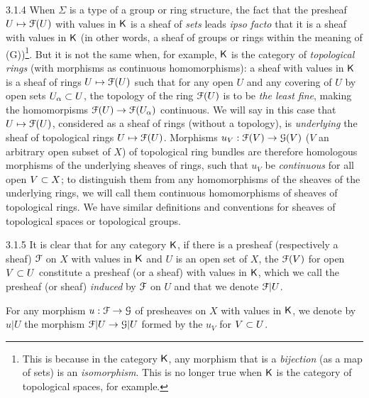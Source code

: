 \documentclass[../main.tex]{subfiles}
\begin{document}
\begin{cx}{3.1.4}
When $\Sigma$ is a type of a group or ring structure, the fact that
the presheaf $U\mapsto\mathcal{F}(U)$ with values in $\mathsf{K}$ is a sheaf of \emph{sets} leads \emph{ipso facto}
that it is a sheaf with values in $\mathsf{K}$ (in other words, a sheaf of groups or rings
within the meaning of (G))\footnote{This is because in the category $\mathsf{K}$, any morphism that is a
\emph{bijection} (as a map of sets) is an \emph{isomorphism}. This is no longer true when $\mathsf{K}$
is the category of topological spaces, for example.}. But it is not the same when, for example,
$\mathsf{K}$ is the category of \emph{topological rings} (with morphisms as continuous homomorphisms): a sheaf
with values in $\mathsf{K}$ is a sheaf of rings $U\mapsto\mathcal{F}(U)$ such that for any open $U$
and any covering of $U$ by open sets $U_\alpha\subset U$, the topology of the ring $\mathcal{F}(U)$
is to be \emph{the least fine}, making the homomorpisms $\mathcal{F}(U)\to\mathcal{F}(U_\alpha)$ continuous. We will say in
this case that $U\mapsto\mathcal{F}(U)$, considered as a sheaf of rings (without a topology), is
\emph{underlying} the sheaf of topological rings $U\mapsto\mathcal{F}(U)$. Morphisms $u_V:\mathcal{F}(V)\to\mathcal{G}(V)$
($V$ an arbitrary open subset of $X$) of topological ring bundles are therefore homologous
morphisms of the underlying sheaves of rings, such that $u_V$ be \emph{continuous} for all
open $V\subset X$; to distinguish them from any homomorphisms of the sheaves
of the underlying rings, we will call them continuous homomorphisms of sheaves of topological rings.
We have similar definitions and conventions for sheaves of topological spaces
or topological groups.
\end{cx}

\begin{cx}{3.1.5}
It is clear that for any category $\mathsf{K}$, if there is a presheaf (respectively a
sheaf) $\mathcal{F}$ on $X$ with values in $\mathsf{K}$ and $U$ is an open set of $X$, the $\mathcal{F}(V)$ for
open $V\subset U$ constitute a presheaf (or a sheaf) with values in $\mathsf{K}$, which we call
the presheaf (or sheaf) \emph{induced} by $\mathcal{F}$ on $U$ and that we denote $\mathcal{F}|U$.

For any morphism $u:\mathcal{F}\to\mathcal{G}$ of presheaves on $X$ with values in $\mathsf{K}$, we
denote by $u|U$ the morphism $\mathcal{F}|U\to\mathcal{G}|U$ formed by the $u_V$ for $V\subset U$.
\end{cx}
\end{document}
